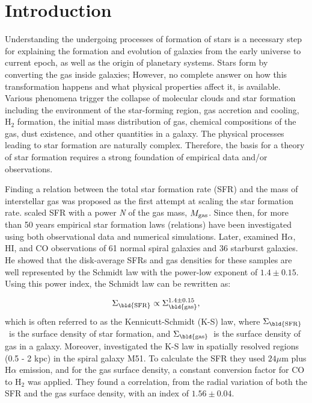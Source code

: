 \documentclass[useAMS,usenatbib]{mn2e}
\newcommand \sigmagas    {$\Sigma_{\rm \bld {gas }} $\ }
\newcommand \eqsigmagas    {\Sigma_{\rm \bld {gas }}}
\newcommand \sigmasfr     {$\Sigma_{\rm \bld {SFR }} $\ }
\newcommand \eqsigmasfr     {\Sigma_{\rm \bld {SFR }}}
\begin{document}
\section{Introduction}
\label{sec:intro}

Understanding the undergoing processes of formation of stars is a necessary step for explaining the formation and evolution of galaxies from the early universe to current epoch, as well as the origin of planetary systems. Stars form by converting the gas inside galaxies; However, no complete answer on how this transformation happens and what physical properties affect it, is available. Various phenomena trigger the collapse of molecular clouds and star formation including the environment of the star-forming region, gas accretion and cooling, H$_2$ formation, the initial mass distribution of gas, chemical compositions of the gas,  dust existence, and other quantities in a galaxy. The physical processes leading to star formation are naturally complex. Therefore, the basis for a theory of star formation requires a strong foundation of empirical data and/or observations.

Finding a relation between the total star formation rate (SFR) and the mass of interstellar gas was proposed as the first attempt at scaling the star formation rate. \cite{Schmidt59} scaled SFR with a power {\it N} of the gas mass, $M_{\rm gas}$. Since then, for more than 50 years empirical star formation laws (relations) have been investigated using both observational data and numerical simulations. Later, \cite{Kennicutt98a} examined H$\alpha$, HI, and CO observations of 61 normal spiral galaxies and 36 starburst galaxies. He showed that the disk-average SFRs and gas densities for these samples are well represented by the Schmidt law with the power-low exponent of $1.4 \pm 0.15$. Using this power index, the Schmidt law can be rewritten as: %

\begin{equation}
\label{equ:ks_org}
\eqsigmasfr \propto \eqsigmagas^{1.4\pm0.15},
\end{equation}
which is often referred to as the Kennicutt-Schmidt (K-S) law, where \sigmasfr is the surface density of star formation, and \sigmagas is the surface density of gas in a galaxy. Moreover, \cite{Kennicutt07} investigated the K-S law in spatially resolved regions (0.5 - 2 kpc) in the spiral galaxy M51. To calculate the SFR they used $24 \mu$m plus H${\alpha}$ emission, and for the gas surface density, a constant conversion factor for CO to H$_2$ was applied. They found a correlation, from the radial variation of both the SFR and the gas surface density, with an index of $1.56 \pm 0.04$. %
\end{document}
